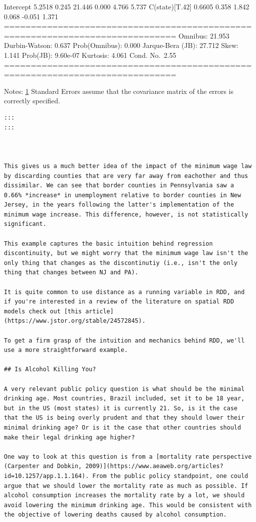 \documentclass[
  letterpaper,
  DIV=11,
  numbers=noendperiod]{scrreprt}
\begin{document}
Intercept 5.2518 0.245 21.446 0.000 4.766 5.737 C(state){[}T.42{]}
0.6605 0.358 1.842 0.068 -0.051 1.371
==============================================================================
Omnibus: 21.953 Durbin-Watson: 0.637 Prob(Omnibus): 0.000 Jarque-Bera
(JB): 27.712 Skew: 1.141 Prob(JB): 9.60e-07 Kurtosis: 4.061 Cond.
No.~2.55
==============================================================================

Notes: \href{http://www.literateprogramming.com/lpquotes.html}{1}
Standard Errors assume that the covariance matrix of the errors is
correctly specified.

\begin{verbatim}
:::
:::



This gives us a much better idea of the impact of the minimum wage law by discarding counties that are very far away from eachother and thus dissimilar. We can see that border counties in Pennsylvania saw a 0.66% *increase* in unemployment relative to border counties in New Jersey, in the years following the latter's implementation of the minimum wage increase. This difference, however, is not statistically significant. 

This example captures the basic intuition behind regression discontinuity, but we might worry that the minimum wage law isn't the only thing that changes as the discontinutiy (i.e., isn't the only thing that changes between NJ and PA). 

It is quite common to use distance as a running variable in RDD, and if you're interested in a review of the literature on spatial RDD models check out [this article](https://www.jstor.org/stable/24572845). 

To get a firm grasp of the intuition and mechanics behind RDD, we'll use a more straightforward example. 

## Is Alcohol Killing You?

A very relevant public policy question is what should be the minimal drinking age. Most countries, Brazil included, set it to be 18 year, but in the US (most states) it is currently 21. So, is it the case that the US is being overly prudent and that they should lower their minimal drinking age? Or is it the case that other countries should make their legal drinking age higher? 

One way to look at this question is from a [mortality rate perspective (Carpenter and Dobkin, 2009)](https://www.aeaweb.org/articles?id=10.1257/app.1.1.164). From the public policy standpoint, one could argue that we should lower the mortality rate as much as possible. If alcohol consumption increases the mortality rate by a lot, we should avoid lowering the minimum drinking age. This would be consistent with the objective of lowering deaths caused by alcohol consumption.


\end{verbatim}
\end{document}
